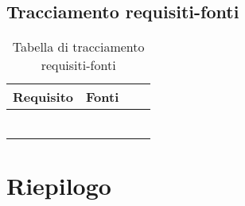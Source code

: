 \documentclass[AnalisiDeiRequisiti.tex]{subfiles}
\begin{document}
\subsection{Tracciamento requisiti-fonti}

\label{table:Tabella di tracciamento requisiti-fonti}
\begin{longtable}[H]{|l|l|l|l|}
	\hline
	\rowcolor[HTML]{38FFF8} 
	\textbf{Requisito} & \textbf{Fonti} \\ \hline
	\endhead
	&  \\ \hline
	&  \\ \hline
	&  \\ \hline
	&  \\ \hline
	&  \\ \hline
	\caption{Tabella di tracciamento requisiti-fonti}
\end{longtable}

\section{Riepilogo}
\end{document}

